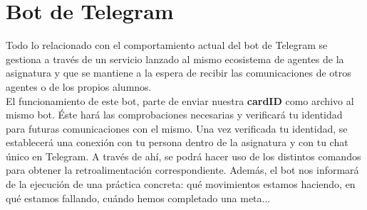 \section{Bot de Telegram}

Todo lo relacionado con el comportamiento actual del bot de Telegram se gestiona a través de un servicio lanzado al mismo ecosistema de agentes de la asignatura y que se mantiene a la espera de recibir las comunicaciones de otros agentes o de los propios alumnos.\\

El funcionamiento de este bot, parte de enviar nuestra \textbf{cardID} como archivo al mismo bot. Éste hará las comprobaciones necesarias y verificará tu identidad para futuras comunicaciones con el mismo. Una vez verificada tu identidad, se establecerá una conexión con tu persona dentro de la asignatura y con tu chat único en Telegram. A través de ahí, se podrá hacer uso de los distintos comandos para obtener la retroalimentación correspondiente. Además, el bot nos informará de la ejecución de una práctica concreta: qué movimientos estamos haciendo, en qué estamos fallando, cuándo hemos completado una meta...